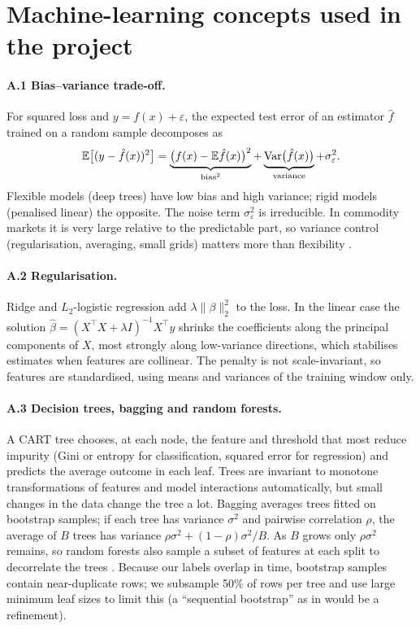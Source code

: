 \section{Machine-learning concepts used in the project}\label{app:theory}

\paragraph{A.1 Bias--variance trade-off.} For squared loss and $y=f(x)+\varepsilon$, the expected test
error of an estimator $\hat f$ trained on a random sample decomposes as
\[\mathbb{E}\big[(y-\hat f(x))^2\big]=\underbrace{\big(f(x)-\mathbb{E}\hat f(x)\big)^2}_{\text{bias}^2}+
\underbrace{\mathrm{Var}\big(\hat f(x)\big)}_{\text{variance}}+\sigma_\varepsilon^2 .\]
Flexible models (deep trees) have low bias and high variance; rigid models (penalised linear) the
opposite. The noise term $\sigma^2_\varepsilon$ is irreducible. In commodity markets it is very large
relative to the predictable part, so variance control (regularisation, averaging, small grids) matters more
than flexibility \citep[ch.~7]{hastie2009}.

\paragraph{A.2 Regularisation.} Ridge and $L_2$-logistic regression add $\lambda\lVert\beta\rVert_2^2$ to
the loss. In the linear case the solution $\hat\beta=(X^\top X+\lambda I)^{-1}X^\top y$ shrinks the
coefficients along the principal components of $X$, most strongly along low-variance directions, which
stabilises estimates when features are collinear. The penalty is not scale-invariant, so features are
standardised, using means and variances of the training window only.

\paragraph{A.3 Decision trees, bagging and random forests.} A CART tree chooses, at each node, the
feature and threshold that most reduce impurity (Gini or entropy for classification, squared error for
regression) and predicts the average outcome in each leaf. Trees are invariant to monotone transformations
of features and model interactions automatically, but small changes in the data change the tree a lot.
Bagging \citep{breiman1996} averages trees fitted on bootstrap samples; if each tree has variance $\sigma^2$
and pairwise correlation $\rho$, the average of $B$ trees has variance
$\rho\sigma^2+(1-\rho)\sigma^2/B$. As $B$ grows only $\rho\sigma^2$ remains, so random forests also
sample a subset of features at each split to decorrelate the trees \citep{breiman2001}. Because our labels
overlap in time, bootstrap samples contain near-duplicate rows; we subsample 50\% of rows per tree and use
large minimum leaf sizes to limit this (a ``sequential bootstrap'' as in \citealp{lopezdeprado2018} would
be a refinement).

